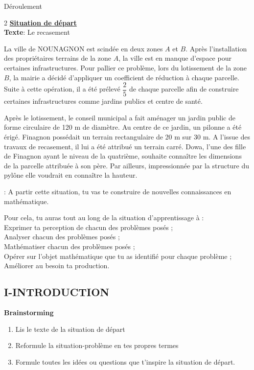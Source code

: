  \newpage
\begin{center}
	Déroulement
		\end{center}
  \begin{multicols*}{2}
  	\underline{\textbf{Situation de départ}} \\
  	\textbf{Texte}: Le recasement 
  	
  	
  	\hspace{0.5cm} La ville de NOUNAGNON est scindée en deux zones $A$ et $B$. Après l'installation des propriétaires terrains de la zone $A$, la ville est en manque d'espace pour certaines infrastructures. Pour pallier ce problème, lors du lotissement de la zone $B$, la mairie a décidé d'appliquer un coefficient de réduction à chaque parcelle. Suite à cette opération, il a été prélevé $\dfrac{2}{5}$ de chaque parcelle afin de construire certaines infrastructures comme jardins publics et centre de santé.
  	
  	Après le lotissement, le conseil municipal a fait aménager un jardin public de forme circulaire de 120 m de diamètre. Au centre de ce jardin, un pilonne a été érigé. 
  	Finagnon possédait un terrain rectangulaire de 20 m sur 30 m. A l'issue des travaux de recasement, il lui a été attribué un terrain carré. Dowa, l'une des fille de Finagnon ayant le niveau de la quatrième, souhaite connaître les dimensions de la parcelle attribuée à son père. Par ailleurs, impressionnée par la structure du pylône elle voudrait en connaître la hauteur.  
  	
  	
  	 : A partir cette situation, tu vas te construire de nouvelles connaissances en mathématique.
  	
  	Pour cela, tu auras tout au long de la situation d’apprentissage à :\\ 
  	 Exprimer ta perception de chacun des problèmes posés ;\\ 
  	 Analyser chacun des problèmes posés ; \\
  	 Mathématiser chacun des problèmes posés ; \\
  	 Opérer sur l’objet mathématique que tu as identifié pour chaque problème ; \\
  	 Améliorer au besoin ta production.
  	\begin{center}
  		\section*{I-INTRODUCTION}
  	\end{center}  
  	 \textbf{ Brainstorming}\\
  	\begin{enumerate}
  		\item  Lis le texte de la situation de départ 
  		\item  Reformule la situation-problème en tes 
  		propres termes 
  		\item  Formule toutes les idées ou questions que 
  		t’inspire la situation de départ.
  	\end{enumerate}
  	

\end{multicols*}
